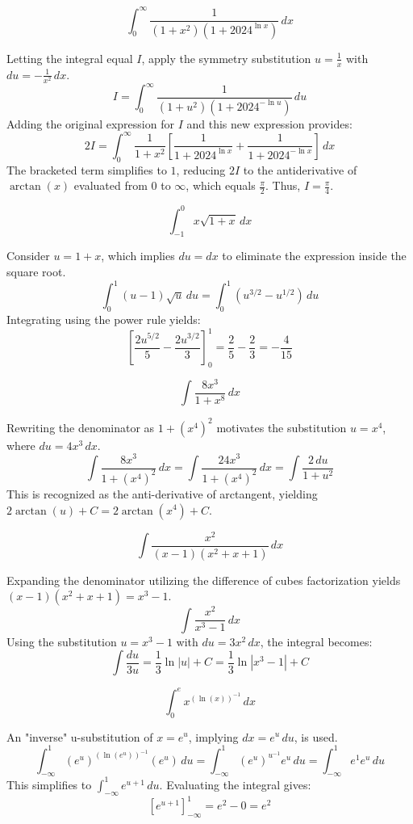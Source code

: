 \begin{questions}
    \question \[ \int_{0}^{\infty}\frac{1}{(1+x^{2})(1+2024^{\ln x})} \,dx \]
    \begin{solution}
        Letting the integral equal $I$, apply the symmetry substitution $u=\frac{1}{x}$ with $du=-\frac{1}{x^{2}} \,dx$.
        \[ I = \int_{0}^{\infty}\frac{1}{(1+u^{2})(1+2024^{-\ln u})} \,du \]
        Adding the original expression for $I$ and this new expression provides:
        \[ 2I = \int_{0}^{\infty}\frac{1}{1+x^{2}}\left[\frac{1}{1+2024^{\ln x}} + \frac{1}{1+2024^{-\ln x}}\right] \,dx \]
        The bracketed term simplifies to $1$, reducing $2I$ to the antiderivative of $\arctan(x)$ evaluated from $0$ to $\infty$, which equals $\frac{\pi}{2}$. Thus, $I = \frac{\pi}{4}$.
    \end{solution}

    \question \[ \int_{-1}^{0}x\sqrt{1+x} \,dx \]
    \begin{solution}
        Consider $u=1+x$, which implies $du=dx$ to eliminate the expression inside the square root.
        \[ \int_{0}^{1}(u-1)\sqrt{u} \,du = \int_{0}^{1}(u^{3/2}-u^{1/2}) \,du \]
        Integrating using the power rule yields:
        \[ \left[ \frac{2u^{5/2}}{5} - \frac{2u^{3/2}}{3} \right]_{0}^{1} = \frac{2}{5} - \frac{2}{3} = -\frac{4}{15} \]
    \end{solution}

    \question \[ \int\frac{8x^{3}}{1+x^{8}} \,dx \]
    \begin{solution}
        Rewriting the denominator as $1+(x^{4})^{2}$ motivates the substitution $u=x^{4}$, where $du=4x^{3} \,dx$.
        \[ \int\frac{8x^{3}}{1+(x^{4})^{2}} \,dx = \int\frac{24x^{3}}{1+(x^{4})^{2}} \,dx = \int\frac{2 \,du}{1+u^{2}} \]
        This is recognized as the anti-derivative of arctangent, yielding $2\arctan(u)+C = 2\arctan(x^{4})+C$.
    \end{solution}

    \question \[ \int\frac{x^{2}}{(x-1)(x^{2}+x+1)} \,dx \]
    \begin{solution}
        Expanding the denominator utilizing the difference of cubes factorization yields $(x-1)(x^{2}+x+1)=x^{3}-1$.
        \[ \int\frac{x^{2}}{x^{3}-1} \,dx \]
        Using the substitution $u=x^{3}-1$ with $du=3x^{2} \,dx$, the integral becomes:
        \[ \int\frac{du}{3u} = \frac{1}{3}\ln|u|+C = \frac{1}{3}\ln|x^{3}-1|+C \]
    \end{solution}

    \question \[ \int_{0}^{e}x^{(\ln(x))^{-1}} \,dx \]
    \begin{solution}
        An "inverse" u-substitution of $x=e^{u}$, implying $dx=e^{u} \,du$, is used.
        \[ \int_{-\infty}^{1}(e^{u})^{(\ln(e^{u}))^{-1}}(e^{u}) \,du = \int_{-\infty}^{1}(e^{u})^{u^{-1}}e^{u} \,du = \int_{-\infty}^{1}e^{1}e^{u} \,du \]
        This simplifies to $\int_{-\infty}^{1}e^{u+1} \,du$. Evaluating the integral gives:
        \[ \left[ e^{u+1} \right]_{-\infty}^{1} = e^{2} - 0 = e^{2} \]
    \end{solution}


\end{questions}
